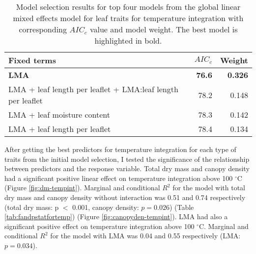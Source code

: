 \documentclass{ttuthes2007}
\begin{document}


\begin{table}
  \centering
  \caption{Model selection results for top four models from the global linear
    mixed effects model for leaf traits for temperature integration with
    corresponding $AIC_{c}$ value and model weight. The best model is highlighted in bold.}
  \begin{tabular}{lrr}
    \toprule
    \textbf{Fixed terms} & $AIC_{c}$ & \textbf{Weight}\\
    \midrule
    \textbf{LMA} & \textbf{76.6} & \textbf{0.326} \\
    LMA + leaf length per leaflet + LMA:leaf length per leaflet & 78.2     & 0.148    \\
    LMA + leaf moisture content                                 & 78.3     & 0.142    \\
    LMA + leaf length per leaflet                               & 78.4     & 0.134    \\
    \bottomrule
  \end{tabular}
  \label{tab:leaf_models}
\end{table}




After getting the best predictors for temperature integration for each type of traits from the initial model selection,
I tested the significance of the relationship  between predictors and the response variable. Total dry mass and canopy density had a significant positive linear effect %
on temperature integration above 100 $^{\circ}$C (Figure \ref{fig:dm-tempint}). Marginal and conditional $R^2$ for the model with total dry mass and canopy density without interaction was 0.51 and 0.74 respectively (total dry mass: p $<$ 0.001, canopy density: $p = 0.026$) (Table \ref{tab:fandpstatfortemp}) (Figure \ref{fig:canopyden-tempint}). LMA had also a significant positive effect on temperature integration above 100 $^{\circ}$C. Marginal  and conditional $R^2$ for the model with LMA was 0.04 and 0.55 respectively (LMA: $p = 0.034$). 
\end{document}

